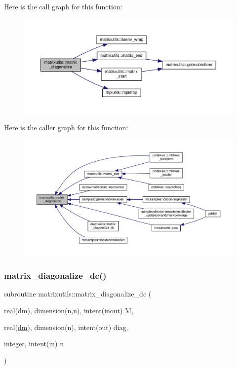 Here is the call graph for this function\+:
\nopagebreak
\begin{figure}[H]
\begin{center}
\leavevmode
\includegraphics[width=350pt]{namespacematrixutils_aa94ed3ad0cf6b18002c5f8ca9cd8b948_cgraph}
\end{center}
\end{figure}
Here is the caller graph for this function\+:
\nopagebreak
\begin{figure}[H]
\begin{center}
\leavevmode
\includegraphics[width=350pt]{namespacematrixutils_aa94ed3ad0cf6b18002c5f8ca9cd8b948_icgraph}
\end{center}
\end{figure}
\mbox{\label{namespacematrixutils_a03b181040e90fb7d7693f10d0716a04f}} 
\subsubsection{\texorpdfstring{matrix\+\_\+diagonalize\+\_\+dc()}{matrix\_diagonalize\_dc()}}
{\footnotesize\ttfamily subroutine matrixutils\+::matrix\+\_\+diagonalize\+\_\+dc (\begin{DoxyParamCaption}\item[{real(\mbox{\hyperlink{namespacematrixutils_a7bdc564986ea4d90f51201c75606ef3d}{dm}}), dimension(n,n), intent(inout)}]{M,  }\item[{real(\mbox{\hyperlink{namespacematrixutils_a7bdc564986ea4d90f51201c75606ef3d}{dm}}), dimension(n), intent(out)}]{diag,  }\item[{integer, intent(in)}]{n }\end{DoxyParamCaption})}



